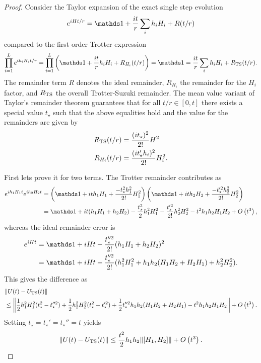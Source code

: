 \begin{proof}
    Consider the Taylor expansion of the exact single step evolution
    \begin{equation}
        e^{i H t/r} = \identity + \frac{i t}{r} \sum_i h_i H_i + R(t / r)
    \end{equation}
    compared to the first order Trotter expression
    \begin{equation}
        \prod_{i = 1}^L e^{i h_i H_i t / r} = \prod_{i = 1}^L \left( \identity + \frac{i t}{r} h_i H_i + R_{H_i}(t/r) \right) = \identity = \frac{i t}{r} \sum_{i} h_i H_i + R_{\rm TS}(t/r).
    \end{equation}
    The remainder term $R$ denotes the ideal remainder, $R_{H_i}$ the remainder for the $H_i$ factor, and $R_{\rm TS}$ the overall Trotter-Suzuki remainder. The mean value variant of Taylor's remainder theorem guarantees that for all $t/r \in [0, t]$ there exists a special value $t_\star$ such that the above equalities hold and the value for the remainders are given by
    \begin{align}
        R_{\rm TS}(t/r) &= \frac{(i t_\star)^2}{2!} H^2 \\
        R_{H_i}(t/r) &= \frac{(i t_\star' h_i)^2}{2!} H_i^2 .
    \end{align}

    First lets prove it for two terms. The Trotter remainder contributes as
    \begin{align}
        e^{i h_1 H_1 t} e^{i h_2 H_2 t} &= \left( \identity + i t h_1 H_1 + \frac{- t_\star^2 h_1^2}{2!} H_1^2 \right)\left( \identity + i t h_2 H_2 + \frac{- t_\star'^2 h_2^2}{2!} H_2^2 \right) \\
        &= \identity + i t (h_1 H_1 + h_2 H_2) - \frac{t_\star^2}{2} h_1^2 H_1^2 - \frac{t_\star'^2 }{2!} h_2^2 H_2^2 - t^2 h_1 h_2 H_1 H_2 + \bigo{t^3},
    \end{align}
    whereas the ideal remainder error is
    \begin{align}
        e^{i H t} &= \identity + i H t - \frac{t_\star''^2}{2!} (h_1 H_1 + h_2 H_2)^2 \\
        &= \identity + i H t - \frac{t_\star''^2}{2!} (h_1^2 H_1^2 + h_1 h_2(H_1 H_2 + H_2 H_1) + h_2^2 H_2^2).
    \end{align}
    This gives the difference as
    \begin{align}
        &\norm{U(t) - U_{\rm TS}(t)} \\
        &\le \norm{\frac{1}{2} h_1^2 H_1^2 (t_\star^2 - t_\star''^2) +  \frac{1}{2} h_2^2 H_2^2 (t_\star^2 - t_\star'^2) +  \frac{1}{2} t_\star''^2 h_1 h_2 (H_1 H_2 + H_2 H_1) - t^2 h_1 h_2 H_1 H_2} + O\left( t^3 \right).
    \end{align}
    Setting $t_\star = t_\star' = t_\star'' = t$ yields
    \begin{equation}
        \norm{U(t) - U_{\rm TS}(t)} \le \frac{t^2}{2} h_1 h_2 \norm{[H_1, H_2]} + O\left( t^3 \right). \label{eq:first_order_trotter_proof_1}
    \end{equation}


\end{proof}
